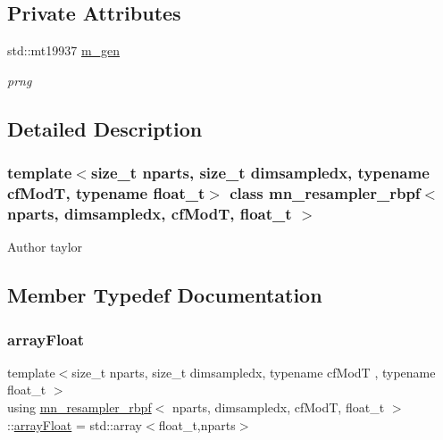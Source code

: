 \subsection*{Private Attributes}
\begin{DoxyCompactItemize}
\item 
\mbox{\label{classmn__resampler__rbpf_ad4ff62e53d193d9126889a59c54a4d0e}} 
std\+::mt19937 \hyperlink{classmn__resampler__rbpf_ad4ff62e53d193d9126889a59c54a4d0e}{m\+\_\+gen}
\begin{DoxyCompactList}\small\item\em prng \end{DoxyCompactList}\end{DoxyCompactItemize}


\subsection{Detailed Description}
\subsubsection*{template$<$size\+\_\+t nparts, size\+\_\+t dimsampledx, typename cf\+ModT, typename float\+\_\+t$>$\newline
class mn\+\_\+resampler\+\_\+rbpf$<$ nparts, dimsampledx, cf\+Mod\+T, float\+\_\+t $>$}

\begin{DoxyAuthor}{Author}
taylor 
\end{DoxyAuthor}


\subsection{Member Typedef Documentation}
\mbox{\label{classmn__resampler__rbpf_a43fa641c6d15c8ee79da47d6af02ac16}} 
\subsubsection{\texorpdfstring{array\+Float}{arrayFloat}}
{\footnotesize\ttfamily template$<$size\+\_\+t nparts, size\+\_\+t dimsampledx, typename cf\+ModT , typename float\+\_\+t $>$ \\
using \hyperlink{classmn__resampler__rbpf}{mn\+\_\+resampler\+\_\+rbpf}$<$ nparts, dimsampledx, cf\+ModT, float\+\_\+t $>$\+::\hyperlink{classmn__resampler__rbpf_a43fa641c6d15c8ee79da47d6af02ac16}{array\+Float} =  std\+::array$<$float\+\_\+t,nparts$>$}

